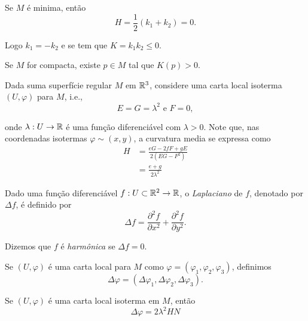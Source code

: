 \begin{demonstracao}
	Se $M$ é minima, então
	\begin{equation*}
	H = \frac{1}{2} (k_1 + k_2) = 0.
	\end{equation*}
	
	Logo $k_1 = -k_2$ e se tem que $K = k_1 k_2 \leq 0$.
	
	Se $M$ for compacta, existe $p \in M$ tal que $K(p) > 0$.
\end{demonstracao}

Dada suma superfície regular $M$ em $\mathbb{R}^3$, considere uma carta local isoterma $(U,\varphi)$ para $M$, i.e., 
\begin{equation*}
E = G = \lambda^2 \text{ e } F=0,
\end{equation*}

onde $\lambda: U \rightarrow \mathbb{R}$ é uma função diferenciável com $\lambda > 0$. Note que, nas coordenadas isotermas $\varphi \sim (x,y)$, a curvatura media se expressa como
\begin{align*}
H &= \frac{eG - 2fF + gE}{2(EG - F^2)}\\
&= \frac{e + g}{2 \lambda^2}
\end{align*}

\begin{definicao}
	Dado uma função diferenciável $f: U \subset \mathbb{R}^2 \rightarrow \mathbb{R}$, o \emph{Laplaciano} de $f$, denotado por $\Delta f$, é definido por
	\begin{equation*}
	\Delta f = \frac{\partial^2 f}{\partial x^2} + \frac{\partial^2 f}{\partial y^2}.
	\end{equation*}
	
	Dizemos que $f$ é \emph{harmônica} se $\Delta f = 0$.
	
	Se $(U, \varphi)$ é uma carta local para $M$ como $\varphi = (\varphi_1, \varphi_2, \varphi_3)$, definimos
	\begin{equation*}
	\Delta \varphi = (\Delta \varphi_1, \Delta \varphi_2, \Delta \varphi_3).
	\end{equation*}
\end{definicao}

\begin{proposicao}
	Se $(U, \varphi)$ é uma carta local isoterma em $M$, então 
	\begin{equation*}
	\Delta \varphi = 2 \lambda^2 H N
	\end{equation*}
\end{proposicao}

